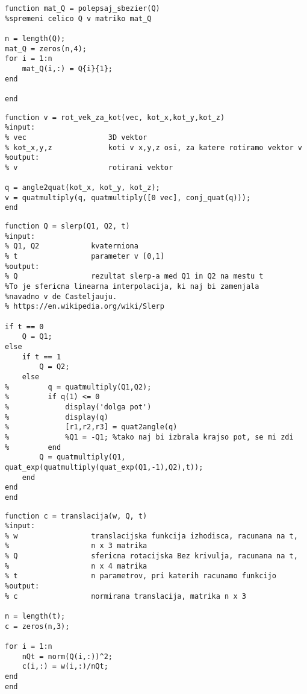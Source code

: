 \documentclass[12pt,a4paper,twoside]{article}
\theoremstyle{definition} %
\theoremstyle{plain} %
\numberwithin{equation}{section}  %
\begin{document}
\begin{lstlisting}[caption = {polepsaj\_sbezier}]
function mat_Q = polepsaj_sbezier(Q)
%spremeni celico Q v matriko mat_Q

n = length(Q);
mat_Q = zeros(n,4);
for i = 1:n
    mat_Q(i,:) = Q{i}{1};
end

end
\end{lstlisting}

\begin{lstlisting}[caption = {rot\_vek\_za\_kot}]
function v = rot_vek_za_kot(vec, kot_x,kot_y,kot_z)
%input:
% vec                   3D vektor
% kot_x,y,z             koti v x,y,z osi, za katere rotiramo vektor v
%output:
% v                     rotirani vektor

q = angle2quat(kot_x, kot_y, kot_z);
v = quatmultiply(q, quatmultiply([0 vec], conj_quat(q)));
end
\end{lstlisting}

\begin{lstlisting}[caption = {slerp}]
function Q = slerp(Q1, Q2, t)
%input:
% Q1, Q2            kvaterniona
% t                 parameter v [0,1]
%output:
% Q                 rezultat slerp-a med Q1 in Q2 na mestu t
%To je sfericna linearna interpolacija, ki naj bi zamenjala
%navadno v de Casteljauju.
% https://en.wikipedia.org/wiki/Slerp

if t == 0
    Q = Q1;
else
    if t == 1
        Q = Q2;
    else
%         q = quatmultiply(Q1,Q2);
%         if q(1) <= 0 
%             display('dolga pot')
%             display(q)
%             [r1,r2,r3] = quat2angle(q)
%             %Q1 = -Q1; %tako naj bi izbrala krajso pot, se mi zdi 
%         end
        Q = quatmultiply(Q1, quat_exp(quatmultiply(quat_exp(Q1,-1),Q2),t));
    end
end
end
\end{lstlisting}


\begin{lstlisting}[caption = {translacija}]
function c = translacija(w, Q, t)
%input:
% w                 translacijska funkcija izhodisca, racunana na t,
%                   n x 3 matrika
% Q                 sfericna rotacijska Bez krivulja, racunana na t,
%                   n x 4 matrika
% t                 n parametrov, pri katerih racunamo funkcijo
%output:
% c                 normirana translacija, matrika n x 3

n = length(t);
c = zeros(n,3);

for i = 1:n
    nQt = norm(Q(i,:))^2;
    c(i,:) = w(i,:)/nQt;
end
end
\end{lstlisting}
\end{document}
